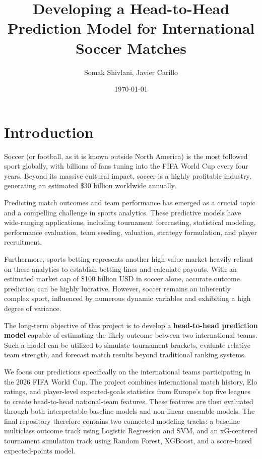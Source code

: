 \documentclass[11pt]{article}
\title{Developing a Head-to-Head Prediction Model for International Soccer Matches}
\author{Somak Shivlani, Javier Carillo}
\date{\today}
\begin{document}
\maketitle

\section{Introduction}

Soccer (or football, as it is known outside North America) is the most followed sport globally, with billions of fans tuning into the FIFA World Cup every four years. Beyond its massive cultural impact, soccer is a highly profitable industry, generating an estimated \$30 billion worldwide annually.

Predicting match outcomes and team performance has emerged as a crucial topic and a compelling challenge in sports analytics. These predictive models have wide-ranging applications, including tournament forecasting, statistical modeling, performance evaluation, team seeding, valuation, strategy formulation, and player recruitment.

Furthermore, sports betting represents another high-value market heavily reliant on these analytics to establish betting lines and calculate payouts. With an estimated market cap of \$100 billion USD in soccer alone, accurate outcome prediction can be highly lucrative. However, soccer remains an inherently complex sport, influenced by numerous dynamic variables and exhibiting a high degree of variance.

The long-term objective of this project is to develop a\textbf{ head-to-head prediction model} capable of estimating the likely outcome between two international teams. Such a model can be utilized to simulate tournament brackets, evaluate relative team strength, and forecast match results beyond traditional ranking systems.

We focus our predictions specifically on the international teams participating in the 2026 FIFA World Cup. The project combines international match history, Elo ratings, and player-level expected-goals statistics from Europe's top five leagues to create head-to-head national-team features. These features are then evaluated through both interpretable baseline models and non-linear ensemble models. The final repository therefore contains two connected modeling tracks: a baseline multiclass outcome track using Logistic Regression and SVM, and an xG-centered tournament simulation track using Random Forest, XGBoost, and a score-based expected-points model.
\end{document}
